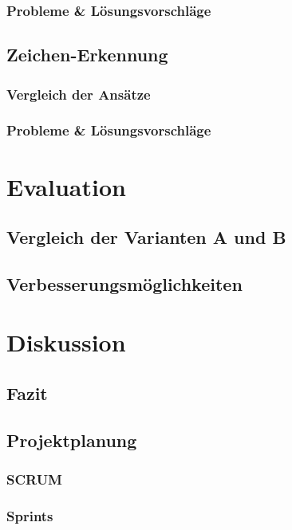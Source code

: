 \documentclass[a4paper,twopage,ngerman,11pt]{scrreprt}
\begin{document}
		\section{Probleme \& Lösungsvorschläge}
		
		\chapter{Zeichen-Erkennung}
		\section{Vergleich der Ansätze}
		\section{Probleme \& Lösungsvorschläge}
		
		

	\part{Evaluation}
		\chapter{Vergleich der Varianten A und B}
		\chapter{Verbesserungsmöglichkeiten}

	\part{Diskussion}
		\chapter{Fazit}



	\printglossaries

	
	
	
	\appendix
	\chapter{Projektplanung}
		\section{SCRUM}
		\section{Sprints}
\end{document}
